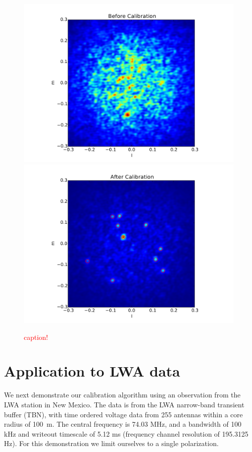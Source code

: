 \documentclass[a4paper,fleqn,usenatbib]{../mnras}
\begin{document}
\begin{figure}
\begin{center}
\includegraphics[width=\columnwidth]{figures/cal_paper_sim_image_before.pdf}
\includegraphics[width=\columnwidth]{figures/cal_paper_sim_image_after.pdf}
\caption{\textcolor{red}{caption!}}
\label{fig:sim_images}
\end{center}
\end{figure}

\section{Application to LWA data}\label{sec:data}
We next demonstrate our calibration algorithm using an observation from the LWA station in New Mexico. The data is from the LWA narrow-band transient buffer (TBN), with time ordered voltage data from 255 antennas within a core radius of 100~m. The central frequency is 74.03 MHz, and a bandwidth of 100 kHz and writeout timescale of 5.12 ms (frequency channel resolution of 195.3125 Hz). For this demonstration we limit ourselves to a single polarization.
\end{document}
